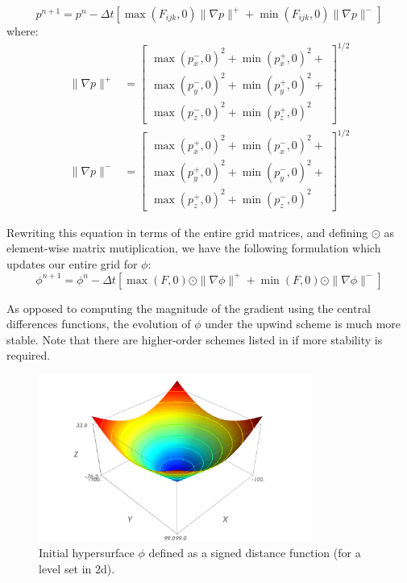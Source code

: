 \documentclass{article}
\begin{document}
\[
p^{n+1} = p^{n} - \Delta t [ \max(F_{ijk}, 0) \| \nabla p \|^{+} + \min(F_{ijk},
0) \| \nabla p \|^{-} ]
\]
where:
\begin{align}
    \| \nabla p \|^{+} & = 
    \begin{bmatrix}
        \max(p^{-}_x, 0)^2 + \min(p^{+}_x, 0)^2 + \\
        \max(p^{-}_y, 0)^2 + \min(p^{+}_y, 0)^2 + \\
        \max(p^{-}_z, 0)^2 + \min(p^{+}_z, 0)^2
    \end{bmatrix}^{1/2}  \\
    \| \nabla p \|^{-} & = 
    \begin{bmatrix}
        \max(p^{+}_x, 0)^2 + \min(p^{-}_x, 0)^2 + \\
        \max(p^{+}_y, 0)^2 + \min(p^{-}_y, 0)^2 + \\
        \max(p^{+}_z, 0)^2 + \min(p^{-}_z, 0)^2
    \end{bmatrix}^{1/2} 
\end{align}

Rewriting this equation in terms of the entire grid matrices, and defining
$\odot$ as element-wise matrix mutiplication, we have the following formulation
which updates our entire grid for $\phi$:
\[
\phi^{n+1} = \phi^{n} - \Delta t [ \max(F, 0) \odot \| \nabla \phi \|^{+} +
\min(F, 0) \odot \| \nabla \phi \|^{-} ]
\]

As opposed to computing the magnitude of the gradient using the central
differences functions, the evolution of $\phi$ under the upwind scheme is much
more stable. Note that there are higher-order schemes listed in
\cite{sethian1999level} if more stability is required.

\begin{figure}[H]
  \centering
  \includegraphics[width=0.8\textwidth]{img/up01.png}
  \caption{Initial hypersurface $\phi$ defined as a signed distance function
  (for a level set in 2d).}    
\end{figure}
\end{document}
